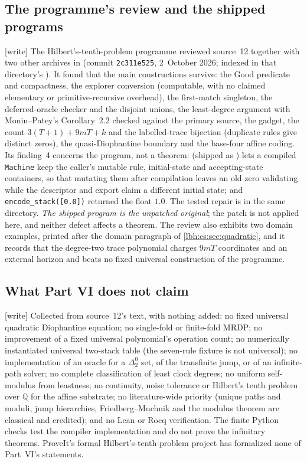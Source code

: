 \documentclass[11pt,letterpaper]{article}
\theoremstyle{definition}
\theoremstyle{remark}
\newcommand{\Q}{\mathbb Q}
\newcommand{\code}[1]{\texttt{#1}}
\newcommand{\1}{\mathbf 1}
\newcommand{\wtag}{\textup{[write]}}%
\begin{document}
\subsection{The programme's review and the shipped programs}\label{lbh:cs:sec:review}
\wtag{} The Hilbert's-tenth-problem programme reviewed source~12 together with two other archives in
(commit \texttt{2c311e525}, 2~October 2026; indexed in that directory's
). It found that the main constructions survive: the
Good predicate and compactness, the explorer conversion (computable, with no claimed elementary or
primitive-recursive overhead), the first-match singleton, the deferred-oracle checker and the
disjoint unions, the least-degree argument with Monin--Patey's Corollary~2.2 checked against the
primary source, the gadget, the count $3(T+1)+9mT+k$ and the labelled-trace bijection (duplicate
rules give distinct zeros), the quasi-Diophantine boundary and the base-four affine coding. Its
finding~4 concerns the program, not a theorem:  (shipped as
) lets a compiled \code{Machine} keep the caller's
mutable rule, initial-state and accepting-state containers, so that mutating them after compilation
leaves an old zero validating while the descriptor and export claim a different initial state; and
\code{encode\_stack([0.0])} returned the float $1.0$. The tested repair is
 in the same directory. \emph{The shipped
program is the unpatched original}; the patch is not applied here, and neither defect affects a
theorem. The review also exhibits two domain examples, printed after the domain paragraph of
\cref{lbh:cs:sec:quadratic}, and it records that the degree-two trace polynomial charges $9mT$
coordinates and an external horizon and beats no fixed universal construction of the programme.

\subsection{What Part VI does not claim}\label{lbh:cs:sec:nonclaims}
\wtag{} Collected from source~12's text, with nothing added: no fixed universal quadratic
Diophantine equation; no single-fold or finite-fold MRDP; no improvement of a fixed universal
polynomial's operation count; no numerically instantiated universal two-stack table (the seven-rule
fixture is not universal); no implementation of an oracle for a $\Delta^0_2$ set, of the
transfinite jump, or of an infinite-path solver; no complete classification of least clock degrees;
no uniform self-modulus from leastness; no continuity, noise tolerance or Hilbert's tenth problem
over $\Q$ for the affine substrate; no literature-wide priority (unique paths and moduli, jump
hierarchies, Friedberg--Muchnik and the modulus theorem are classical and credited); and no Lean or
Rocq verification. The finite Python checks test the compiler implementation and do not prove the
infinitary theorems. ProveIt's formal Hilbert's-tenth-problem project has formalized none of
Part~VI's statements.
\end{document}

